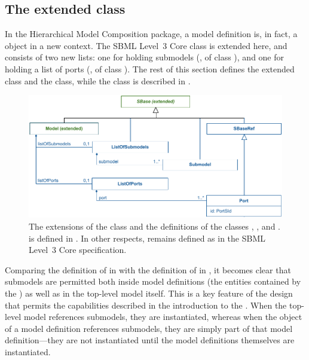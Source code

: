 \subsection{The extended  class}
\label{model-class}
\label{listofsubmodels-class}
\label{listofports-class}

In the Hierarchical Model Composition package, a model definition is, in
fact, a \Model object in a new context.  The SBML Level~3 Core \Model
class is extended here, and consists of two new lists: one for holding
submodels (, of class \ListOfSubmodels), and one
for holding a list of ports (, of class
\ListOfPorts).  The rest of this section defines the extended \Model
class and the \Port class, while the \Submodel class is described in
.

\begin{figure}[hbt]
  \includegraphics{figs/extended-model-uml}
  \caption{The extensions of the \Model class and the definitions of the
    classes \Port, \ListOfPorts, and \ListOfSubmodels.  \Submodel is
    defined in . In other respects, \Model remains
    defined as in the SBML Level~3 Core specification.}
  \label{extended-model-uml}
  \label{port-uml}
\end{figure}

Comparing the definition of \SBML in  with
the definition of \Model in , it becomes clear
that submodels are permitted both inside model definitions (the entities
contained by the \ListOfModelDefinitions) as well as in the top-level
model itself.  This is a key feature of the design that permits the
capabilities described in the introduction to the .
When the top-level model references submodels, they are instantiated,
whereas when the \Model object of a model definition references
submodels, they are simply part of that model definition---they are not
instantiated until the model definitions themselves are instantiated.


